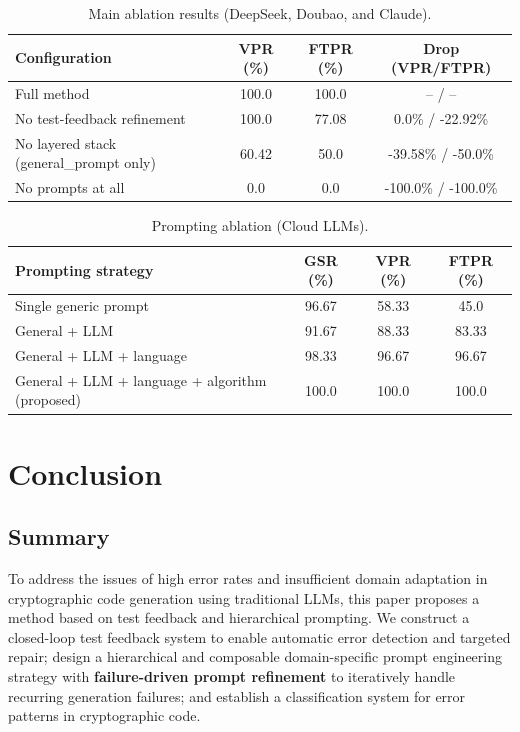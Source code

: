 \documentclass[runningheads]{llncs}
\begin{document}
\begin{table}[H]
  \centering
  \caption{Main ablation results (DeepSeek, Doubao, and Claude).}
  \label{tab:ablation_main}
  {\scriptsize\setlength{\tabcolsep}{2.5pt}\renewcommand{\arraystretch}{0.95}
  \begin{tabular}{l c c c}
    \toprule
    Configuration & VPR (\%) & FTPR (\%) & Drop (VPR/FTPR) \\
    \midrule
    Full method & 100.0 & 100.0 & -- / -- \\
    No test-feedback refinement & 100.0 & 77.08 & 0.0\% / -22.92\% \\
    No layered stack (general\_prompt only) & 60.42 & 50.0 & -39.58\% / -50.0\% \\
    No prompts at all & 0.0 & 0.0 & -100.0\% / -100.0\% \\
    \bottomrule
  \end{tabular}
  }
\end{table}

\begin{table}[H]
  \centering
  \caption{Prompting ablation (Cloud LLMs).}
  \label{tab:ablation_prompt}
  {\scriptsize\setlength{\tabcolsep}{2pt}\renewcommand{\arraystretch}{0.92}
  \begin{tabular}{l c c c}
    \toprule
    Prompting strategy & GSR (\%) & VPR (\%) & FTPR (\%) \\
    \midrule
    Single generic prompt & 96.67 & 58.33 & 45.0 \\
    General + LLM & 91.67 & 88.33 & 83.33 \\
    General + LLM + language & 98.33 & 96.67 & 96.67 \\
    General + LLM + language + algorithm (proposed) & 100.0 & 100.0 & 100.0 \\
    \bottomrule
  \end{tabular}
  }
\end{table}

\section{Conclusion}
\label{sec:conclusion}
\subsection{Summary}
To address the issues of high error rates and insufficient domain adaptation in cryptographic code generation using traditional LLMs, this paper proposes a method based on test feedback and hierarchical prompting. We construct a closed-loop test feedback system to enable automatic error detection and targeted repair; design a hierarchical and composable domain-specific prompt engineering strategy with \textbf{failure-driven prompt refinement} to iteratively handle recurring generation failures; and establish a classification system for error patterns in cryptographic code. 
\end{document}

